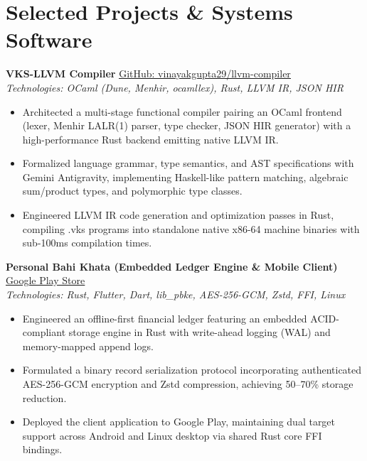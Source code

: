 \documentclass[10pt,a4paper]{article}
\begin{document}
\section*{Selected Projects \& Systems Software}

\textbf{VKS-LLVM Compiler} \hfill \href{https://github.com/vinayakgupta29/llvm-compiler}{\underline{GitHub: vinayakgupta29/llvm-compiler}} \\
\textit{Technologies: OCaml (Dune, Menhir, ocamllex), Rust, LLVM IR, JSON HIR}
\begin{itemize}
  \item Architected a multi-stage functional compiler pairing an OCaml frontend (lexer, Menhir LALR(1) parser, type checker, JSON HIR generator) with a high-performance Rust backend emitting native LLVM IR.
  \item Formalized language grammar, type semantics, and AST specifications with Gemini Antigravity, implementing Haskell-like pattern matching, algebraic sum/product types, and polymorphic type classes.
  \item Engineered LLVM IR code generation and optimization passes in Rust, compiling .vks programs into standalone native x86-64 machine binaries with sub-100ms compilation times.
\end{itemize}

\vspace{3pt}
\textbf{Personal Bahi Khata (Embedded Ledger Engine \& Mobile Client)} \hfill \href{https://play.google.com/store/apps/details?id=com.vins.bahi_khata}{\underline{Google Play Store}} \\
\textit{Technologies: Rust, Flutter, Dart, lib\_pbke, AES-256-GCM, Zstd, FFI, Linux}
\begin{itemize}
  \item Engineered an offline-first financial ledger featuring an embedded ACID-compliant storage engine in Rust with write-ahead logging (WAL) and memory-mapped append logs.
  \item Formulated a binary record serialization protocol incorporating authenticated AES-256-GCM encryption and Zstd compression, achieving 50--70\% storage reduction.
  \item Deployed the client application to Google Play, maintaining dual target support across Android and Linux desktop via shared Rust core FFI bindings.
\end{itemize}
\end{document}
